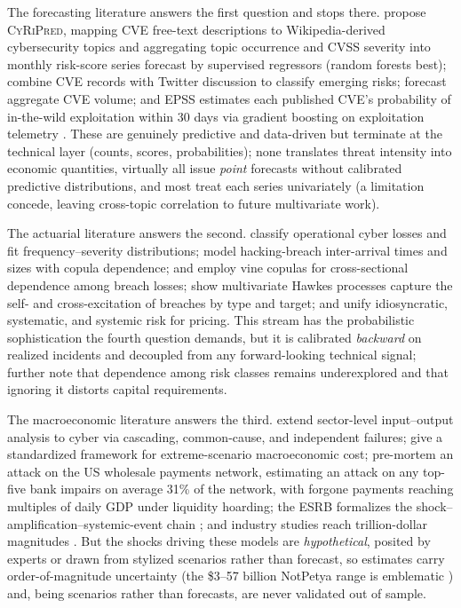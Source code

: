 \documentclass[review]{elsarticle}
\begin{document}
The forecasting literature answers the first question and stops there. \citet{kia2024} propose \textsc{CyRiPred}, mapping CVE free-text descriptions to Wikipedia-derived cybersecurity topics and aggregating topic occurrence and CVSS severity into monthly risk-score series forecast by supervised regressors (random forests best); \citet{subroto2019} combine CVE records with Twitter discussion to classify emerging risks; \citet{leverett2020} forecast aggregate CVE volume; and EPSS estimates each published CVE's probability of in-the-wild exploitation within 30 days via gradient boosting on exploitation telemetry \citep{jacobs2021,jacobs2023}. These are genuinely predictive and data-driven but terminate at the technical layer (counts, scores, probabilities); none translates threat intensity into economic quantities, virtually all issue \emph{point} forecasts without calibrated predictive distributions, and most treat each series univariately (a limitation \citet{kia2024} concede, leaving cross-topic correlation to future multivariate work).

The actuarial literature answers the second. \citet{eling2019} classify operational cyber losses and fit frequency--severity distributions; \citet{xu2018} model hacking-breach inter-arrival times and sizes with copula dependence; \citet{eling2018} and \citet{peng2018} employ vine copulas for cross-sectional dependence among breach losses; \citet{bessyroland2021} show multivariate Hawkes processes capture the self- and cross-excitation of breaches by type and target; and \citet{awiszus2023} unify idiosyncratic, systematic, and systemic risk for pricing. This stream has the probabilistic sophistication the fourth question demands, but it is calibrated \emph{backward} on realized incidents and decoupled from any forward-looking technical signal; \citet{carannante2023} further note that dependence among risk classes remains underexplored and that ignoring it distorts capital requirements.

The macroeconomic literature answers the third. \citet{welburn2022} extend sector-level input--output analysis to cyber via cascading, common-cause, and independent failures; \citet{eling2023} give a standardized framework for extreme-scenario macroeconomic cost; \citet{eisenbach2022} pre-mortem an attack on the US wholesale payments network, estimating an attack on any top-five bank impairs on average 31\% of the network, with forgone payments reaching multiples of daily GDP under liquidity hoarding; the ESRB formalizes the shock--amplification--systemic-event chain \citep{esrb2020}; and industry studies reach trillion-dollar magnitudes \citep{lloyds2023}. But the shocks driving these models are \emph{hypothetical}, posited by experts or drawn from stylized scenarios rather than forecast, so estimates carry order-of-magnitude uncertainty (the \$3--57 billion NotPetya range is emblematic \citep{welburn2022}) and, being scenarios rather than forecasts, are never validated out of sample.
\end{document}
